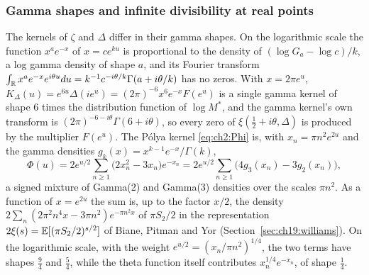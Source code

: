 \subsubsection{Gamma shapes and infinite divisibility at real points}\label{sec:maxexp:gamma}

The kernels of $\zeta$ and $\Delta$ differ in their gamma shapes. On the logarithmic scale the function $x^ae^{-x}$ of $x=ce^{ku}$ is proportional to the density of $(\log G_a-\log c)/k$, a log gamma density of shape $a$, and its Fourier transform $\int_{\mathbb{R}}x^ae^{-x}e^{i\theta u}du=k^{-1}c^{-i\theta/k}\Gamma(a+i\theta/k)$ has no zeros. With $x=2\pi e^u$, $K_\Delta(u)=e^{6u}\Delta(ie^u)=(2\pi)^{-6}x^6e^{-x}F(e^u)$ is a single gamma kernel of shape $6$ times the distribution function of $\log M^*$, and the gamma kernel's own transform is $(2\pi)^{-6-i\theta}\Gamma(6+i\theta)$, so every zero of $\xi(\frac12+i\theta,\Delta)$ is produced by the multiplier $F(e^u)$. The P\'olya kernel \eqref{eq:ch2:Phi} is, with $x_n=\pi n^2e^{2u}$ and the gamma densities $g_k(x)=x^{k-1}e^{-x}/\Gamma(k)$,
\[
\Phi(u)=2e^{u/2}\sum_{n\ge1}\big(2x_n^2-3x_n\big)e^{-x_n}=2e^{u/2}\sum_{n\ge1}\big(4g_3(x_n)-3g_2(x_n)\big),
\]
a signed mixture of Gamma(2) and Gamma(3) densities over the scales $\pi n^2$. As a function of $x=e^{2u}$ the sum is, up to the factor $x/2$, the density $2\sum_n(2\pi^2n^4x-3\pi n^2)e^{-\pi n^2x}$ of $\pi S_2/2$ in the representation $2\xi(s)=\mathbb{E}[(\pi S_2/2)^{s/2}]$ of Biane, Pitman and Yor (Section~\ref{sec:ch19:williams}). On the logarithmic scale, with the weight $e^{u/2}=(x_n/\pi n^2)^{1/4}$, the two terms have shapes $\frac94$ and $\frac54$, while the theta function itself contributes $x_n^{1/4}e^{-x_n}$, of shape $\frac14$.

